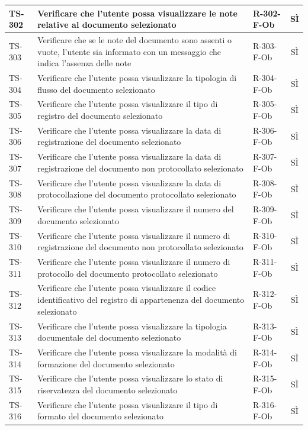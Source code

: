 \documentclass[a4paper,12pt]{article}
\begin{document}
\begin{longtable}{|p{1.5cm}|p{8.3cm}|p{2.4cm}|c|}
\hline
TS-302 & Verificare che l'utente possa visualizzare le note relative al documento selezionato & R-302-F-Ob & SÌ \\
\hline
TS-303 & Verificare che se le note del documento sono assenti o vuote, l'utente sia informato con un messaggio che indica l'assenza delle note & R-303-F-Ob & SÌ \\
\hline
TS-304 & Verificare che l'utente possa visualizzare la tipologia di flusso del documento selezionato & R-304-F-Ob & SÌ \\
\hline
TS-305 & Verificare che l'utente possa visualizzare il tipo di registro del documento selezionato & R-305-F-Ob & SÌ \\
\hline
TS-306 & Verificare che l'utente possa visualizzare la data di registrazione del documento selezionato & R-306-F-Ob & SÌ \\
\hline
TS-307 & Verificare che l'utente possa visualizzare la data di registrazione del documento non protocollato selezionato & R-307-F-Ob & SÌ \\
\hline
TS-308 & Verificare che l'utente possa visualizzare la data di protocollazione del documento protocollato selezionato & R-308-F-Ob & SÌ \\
\hline
TS-309 & Verificare che l'utente possa visualizzare il numero del documento selezionato & R-309-F-Ob & SÌ \\
\hline
TS-310 & Verificare che l'utente possa visualizzare il numero di registrazione del documento non protocollato selezionato & R-310-F-Ob & SÌ \\
\hline
TS-311 & Verificare che l'utente possa visualizzare il numero di protocollo del documento protocollato selezionato & R-311-F-Ob & SÌ \\
\hline
TS-312 & Verificare che l'utente possa visualizzare il codice identificativo del registro di appartenenza del documento selezionato & R-312-F-Ob & SÌ \\
\hline
TS-313 & Verificare che l'utente possa visualizzare la tipologia documentale del documento selezionato & R-313-F-Ob & SÌ \\
\hline
TS-314 & Verificare che l'utente possa visualizzare la modalità di formazione del documento selezionato & R-314-F-Ob & SÌ \\
\hline
TS-315 & Verificare che l'utente possa visualizzare lo stato di riservatezza del documento selezionato & R-315-F-Ob & SÌ \\
\hline
TS-316 & Verificare che l'utente possa visualizzare il tipo di formato del documento selezionato & R-316-F-Ob & SÌ \\

\end{longtable}
\end{document}

